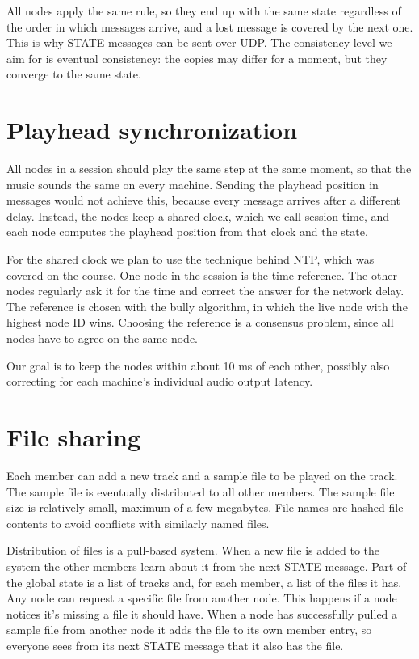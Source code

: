 \documentclass{article}
\begin{document}
All nodes apply the same rule, so they end up with the same state regardless of the order in which messages arrive, and a lost message is covered by the next one. This is why STATE messages can be sent over UDP. The consistency level we aim for is eventual consistency: the copies may differ for a moment, but they converge to the same state.

\section{Playhead synchronization}

All nodes in a session should play the same step at the same moment, so that the music sounds the same on every machine. Sending the playhead position in messages would not achieve this, because every message arrives after a different delay. Instead, the nodes keep a shared clock, which we call session time, and each node computes the playhead position from that clock and the state.

For the shared clock we plan to use the technique behind NTP, which was covered on the course. One node in the session is the time reference. The other nodes regularly ask it for the time and correct the answer for the network delay. The reference is chosen with the bully algorithm, in which the live node with the highest node ID wins. Choosing the reference is a consensus problem, since all nodes have to agree on the same node.

Our goal is to keep the nodes within about 10 ms of each other, possibly also correcting for each machine's individual audio output latency.

\section{File sharing}

Each member can add a new track and a sample file to be played on the track.
The sample file is eventually distributed to all other members.
The sample file size is relatively small, maximum of a few megabytes.
File names are hashed file contents to avoid conflicts with similarly named files.

Distribution of files is a pull-based system.
When a new file is added to the system the other members learn about it from the next STATE message.
Part of the global state is a list of tracks and, for each member, a list of the files it has.
Any node can request a specific file from another node.
This happens if a node notices it's missing a file it should have.
When a node has successfully pulled a sample file from another node it adds the file to its own member entry, so everyone sees from its next STATE message that it also has the file.
\end{document}
